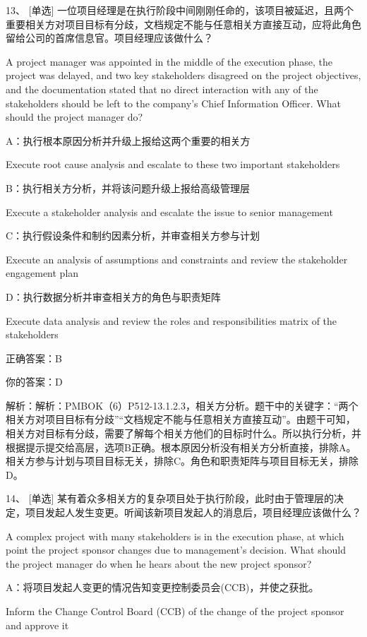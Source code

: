 13、 [单选] 一位项目经理是在执行阶段中间刚刚任命的，该项目被延迟，且两个重要相关方对项目目标有分歧，文档规定不能与任意相关方直接互动，应将此角色留给公司的首席信息官。项目经理应该做什么？

A project manager was appointed in the middle of the execution phase, the project was delayed, and two key stakeholders disagreed on the project objectives, and the documentation stated that no direct interaction with any of the stakeholders should be left to the company's Chief Information Officer. What should the project manager do?

A：执行根本原因分析并升级上报给这两个重要的相关方

Execute root cause analysis and escalate to these two important stakeholders

B：执行相关方分析，并将该问题升级上报给高级管理层

Execute a stakeholder analysis and escalate the issue to senior management

C：执行假设条件和制约因素分析，并审查相关方参与计划

Execute an analysis of assumptions and constraints and review the stakeholder engagement plan

D：执行数据分析并审查相关方的角色与职责矩阵

Execute data analysis and review the roles and responsibilities matrix of the stakeholders

正确答案：B

你的答案：D

解析：解析：PMBOK（6）P512-13.1.2.3，相关方分析。题干中的关键字：“两个相关方对项目目标有分歧”“文档规定不能与任意相关方直接互动”。由题干可知，相关方对目标有分歧，需要了解每个相关方他们的目标时什么。所以执行分析，并根据提示提交给高层，选项B正确。根本原因分析没有相关方分析直接，排除A。相关方参与计划与项目目标无关，排除C。角色和职责矩阵与项目目标无关，排除D。

14、 [单选] 某有着众多相关方的复杂项目处于执行阶段，此时由于管理层的决定，项目发起人发生变更。听闻该新项目发起人的消息后，项目经理应该做什么？

A complex project with many stakeholders is in the execution phase, at which point the project sponsor changes due to management's decision. What should the project manager do when he hears about the new project sponsor?

A：将项目发起人变更的情况告知变更控制委员会(CCB)，并使之获批。

Inform the Change Control Board (CCB) of the change of the project sponsor and approve it

